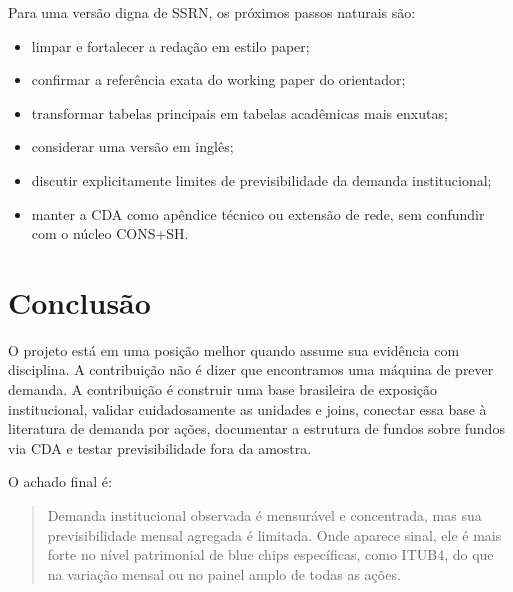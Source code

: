 \documentclass[11pt,a4paper]{article}
\begin{document}
Para uma versão digna de SSRN, os próximos passos naturais são:
\begin{itemize}
\item limpar e fortalecer a redação em estilo paper;
\item confirmar a referência exata do working paper do orientador;
\item transformar tabelas principais em tabelas acadêmicas mais enxutas;
\item considerar uma versão em inglês;
\item discutir explicitamente limites de previsibilidade da demanda institucional;
\item manter a CDA como apêndice técnico ou extensão de rede, sem confundir com o núcleo CONS+SH.
\end{itemize}

\section{Conclusão}

O projeto está em uma posição melhor quando assume sua evidência com disciplina. A contribuição não é dizer
que encontramos uma máquina de prever demanda. A contribuição é construir uma base brasileira de exposição
institucional, validar cuidadosamente as unidades e joins, conectar essa base à literatura de demanda por
ações, documentar a estrutura de fundos sobre fundos via CDA e testar previsibilidade fora da amostra.

O achado final é:
\begin{quote}
Demanda institucional observada é mensurável e concentrada, mas sua previsibilidade mensal agregada é
limitada. Onde aparece sinal, ele é mais forte no nível patrimonial de blue chips específicas, como ITUB4,
do que na variação mensal ou no painel amplo de todas as ações.
\end{quote}



\end{document}
